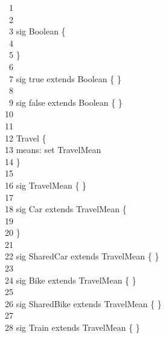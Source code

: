 \-     \ \ 1    \\
\-     \ \ 2    \qquad \\
\-     \ \ 3     {\color{blue}sig} Boolean \{\\
\-     \ \ 4    \qquad \\
\-     \ \ 5    \qquad \}\\
\-     \ \ 6    \qquad \\
\-     \ \ 7     {\color{blue}sig} true {\color{blue}extends} Boolean \{ \}\\
\-     \ \ 8    \qquad \\
\-     \ \ 9     {\color{blue}sig} false {\color{blue}extends} Boolean \{ \}\\
\-    \ 10      \qquad \\
\-    \ 11      \qquad \\
\-    \ 12       Travel \{\\
\-    \ 13      \qquad \-\qquad means: {\color{blue}set} TravelMean\\
\-    \ 14      \qquad \}\\
\-    \ 15      \qquad \\
\-    \ 16       {\color{blue}sig} TravelMean \{ \}\\
\-    \ 17      \qquad \\
\-    \ 18       {\color{blue}sig} Car {\color{blue}extends} TravelMean \{\\
\-    \ 19      \qquad \\
\-    \ 20      \qquad \}\\
\-    \ 21      \qquad \\
\-    \ 22       {\color{blue}sig} SharedCar {\color{blue}extends} TravelMean \{ \}\\
\-    \ 23      \qquad \\
\-    \ 24       {\color{blue}sig} Bike {\color{blue}extends} TravelMean \{ \}\\
\-    \ 25      \qquad \\
\-    \ 26       {\color{blue}sig} SharedBike {\color{blue}extends} TravelMean \{ \}\\
\-    \ 27      \qquad \\
\-    \ 28       {\color{blue}sig} Train {\color{blue}extends} TravelMean \{ \}\\
